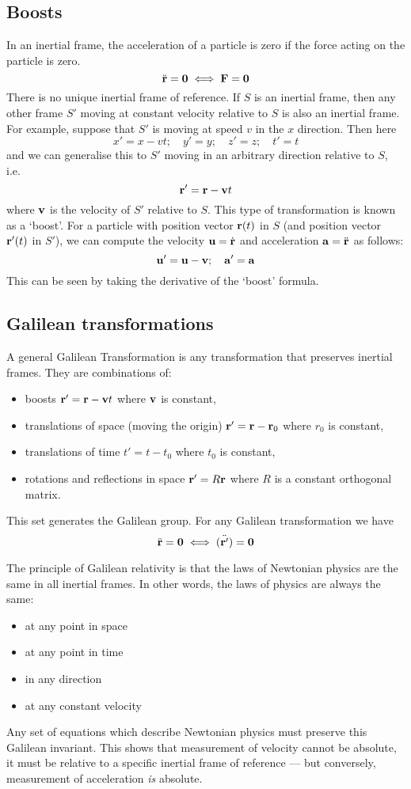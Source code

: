 \subsection{Boosts}
In an inertial frame, the acceleration of a particle is zero if the force acting on the particle is zero.
\[
	\ddot{\vb r} = \vb 0 \iff \vb F = \vb 0
\]
There is no unique inertial frame of reference.
If \(S\) is an inertial frame, then any other frame \(S'\) moving at constant velocity relative to \(S\) is also an inertial frame.
For example, suppose that \(S'\) is moving at speed \(v\) in the \(x\) direction.
Then here
\[
	x'=x-vt;\quad y'=y;\quad z'=z;\quad t'=t
\]
and we can generalise this to \(S'\) moving in an arbitrary direction relative to \(S\), i.e.
\[
	\vb r' = \vb r - \vb v t
\]
where \(\vb v\) is the velocity of \(S'\) relative to \(S\).
This type of transformation is known as a `boost'.
For a particle with position vector \(\vb r(t)\) in \(S\) (and position vector \(\vb r'(t)\) in \(S'\)), we can compute the velocity \(\vb u = \dot{\vb r}\) and acceleration \(\vb a = \ddot{\vb r}\) as follows:
\[
	\vb u' = \vb u - \vb v;\quad \vb a' = \vb a
\]
This can be seen by taking the derivative of the `boost' formula.

\subsection{Galilean transformations}
A general Galilean Transformation is any transformation that preserves inertial frames.
They are combinations of:
\begin{itemize}
	\item boosts \(\vb r' = \vb r - \vb vt\) where \(\vb v\) is constant,
	\item translations of space (moving the origin) \(\vb r' = \vb r - \vb r_0\) where \(r_0\) is constant,
	\item translations of time \(t' = t - t_0\) where \(t_0\) is constant,
	\item rotations and reflections in space \(\vb r' = R \vb r\) where \(R\) is a constant orthogonal matrix.
\end{itemize}
This set generates the Galilean group.
For any Galilean transformation we have
\[
	\ddot{\vb r} = \vb 0 \iff \ddot{(\vb r')} = \vb 0
\]

The principle of Galilean relativity is that the laws of Newtonian physics are the same in all inertial frames.
In other words, the laws of physics are always the same:
\begin{itemize}
	\item at any point in space
	\item at any point in time
	\item in any direction
	\item at any constant velocity
\end{itemize}
Any set of equations which describe Newtonian physics must preserve this Galilean invariant.
This shows that measurement of velocity cannot be absolute, it must be relative to a specific inertial frame of reference --- but conversely, measurement of acceleration \textit{is} absolute.

